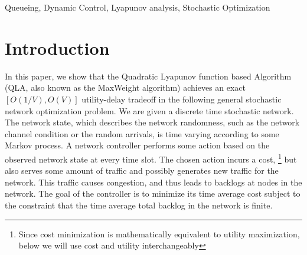 \documentclass[journal]{IEEEtran}
\begin{document}
\begin{abstract}
 \end{abstract}
 

\begin{keywords}
Queueing, Dynamic Control, Lyapunov analysis,  Stochastic Optimization
\end{keywords}

\section{Introduction}
In this paper, we show that the Quadratic Lyapunov function based Algorithm (QLA, also known as the MaxWeight algorithm) \cite{neelynowbook} achieves an exact $[O(1/V), O(V)]$ utility-delay tradeoff in the following general stochastic network optimization problem.  We are given a discrete time stochastic network. The network state, which describes  the network randomness, such as the network channel condition or the random arrivals, is time varying according to some Markov process. A network controller performs some action based on the observed network state at every time slot. The chosen action incurs a cost, \footnote{Since cost minimization is mathematically equivalent to utility maximization, below we will use cost and utility interchangeably} but also serves some amount of traffic and possibly generates new traffic for the network.  This traffic causes congestion, and thus leads to backlogs at nodes in the network. The goal of the controller is to minimize its time average cost subject to the constraint that the time average total backlog in the network is finite. 
\end{document}
